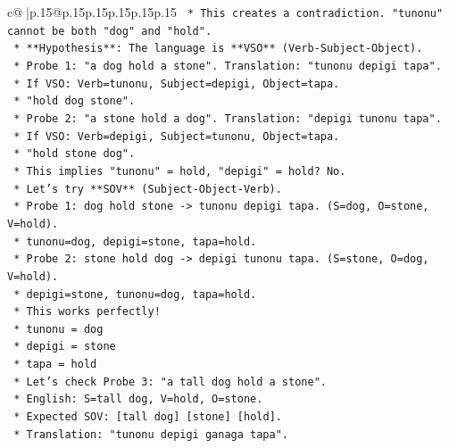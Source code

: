\documentclass{article}
\begin{document}
{\begin{supertabular}{c@{$\;$}|p{.15\linewidth}@{}p{.15\linewidth}p{.15\linewidth}p{.15\linewidth}p{.15\linewidth}p{.15\linewidth}}
{{{\texttt{                *   This creates a contradiction. "tunonu" cannot be both "dog" and "hold".} \\
\texttt{            *   **Hypothesis**: The language is **VSO** (Verb{-}Subject{-}Object).} \\
\texttt{                *   Probe 1: "a dog hold a stone". Translation: "tunonu depigi tapa".} \\
\texttt{                    *   If VSO: Verb=tunonu, Subject=depigi, Object=tapa.} \\
\texttt{                    *   "hold dog stone".} \\
\texttt{                *   Probe 2: "a stone hold a dog". Translation: "depigi tunonu tapa".} \\
\texttt{                    *   If VSO: Verb=depigi, Subject=tunonu, Object=tapa.} \\
\texttt{                    *   "hold stone dog".} \\
\texttt{                *   This implies "tunonu" = hold, "depigi" = hold? No.} \\
\texttt{                *   Let's try **SOV** (Subject{-}Object{-}Verb).} \\
\texttt{                    *   Probe 1: dog hold stone {-}> tunonu depigi tapa. (S=dog, O=stone, V=hold).} \\
\texttt{                        *   tunonu=dog, depigi=stone, tapa=hold.} \\
\texttt{                    *   Probe 2: stone hold dog {-}> depigi tunonu tapa. (S=stone, O=dog, V=hold).} \\
\texttt{                        *   depigi=stone, tunonu=dog, tapa=hold.} \\
\texttt{                    *   This works perfectly!} \\
\texttt{                        *   tunonu = dog} \\
\texttt{                        *   depigi = stone} \\
\texttt{                        *   tapa = hold} \\
\texttt{                    *   Let's check Probe 3: "a tall dog hold a stone".} \\
\texttt{                        *   English: S=tall dog, V=hold, O=stone.} \\
\texttt{                        *   Expected SOV: {[}tall dog{]} {[}stone{]} {[}hold{]}.} \\
\texttt{                        *   Translation: "tunonu depigi ganaga tapa".} \\
}}}
\end{supertabular}}
\end{document}
